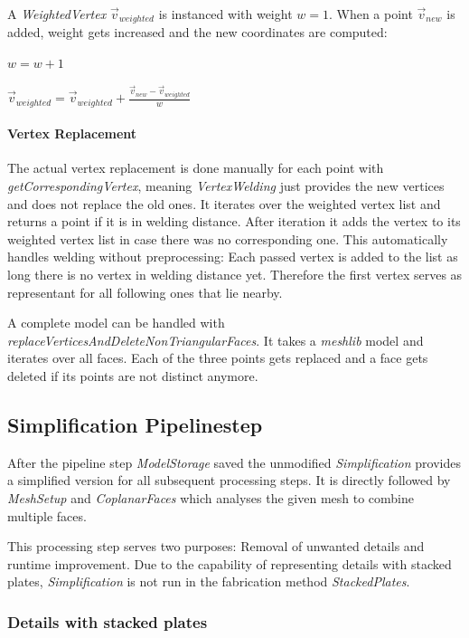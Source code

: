 \documentclass[../ClassicThesis.tex]{subfiles}
\begin{document}
A \emph{WeightedVertex} $\vec{v}_{weighted}$ is instanced with weight $w = 1$. When a point $\vec{v}_{new}$ is added, weight gets increased and the new coordinates are computed:

$ w = w + 1 $

$ \vec{v}_{weighted} = \vec{v}_{weighted} + \frac{\vec{v}_{new} - \vec{v}_{weighted}}{w}$


\paragraph{Vertex Replacement}

The actual vertex replacement is done manually for each point with \emph{getCorrespondingVertex}, meaning \emph{VertexWelding} just provides the new vertices and does not replace the old ones. It iterates over the weighted vertex list and returns a point if it is in welding distance. After iteration it adds the vertex to its weighted vertex list in case there was no corresponding one. This automatically handles welding without preprocessing: Each passed vertex is added to the list as long there is no vertex in welding distance yet. Therefore the first vertex serves as representant for all following ones that lie nearby.

A complete model can be handled with \emph{replaceVerticesAndDeleteNonTriangularFaces}. It takes a \emph{meshlib} model and iterates over all faces. Each of the three points gets replaced and a face gets deleted if its points are not distinct anymore.




\subsection{Simplification Pipelinestep}

After the pipeline step \emph{ModelStorage} saved the unmodified {\threedmodel} \emph{Simplification} provides a simplified version for all subsequent processing steps. It is directly followed by \emph{MeshSetup} and \emph{CoplanarFaces} which analyses the given mesh to combine multiple faces.

This processing step serves two purposes: Removal of unwanted details and runtime improvement. Due to the capability of representing details with stacked plates, \emph{Simplification} is not run in the fabrication method \emph{StackedPlates}.

\subsubsection{Details with stacked plates}
\end{document}
